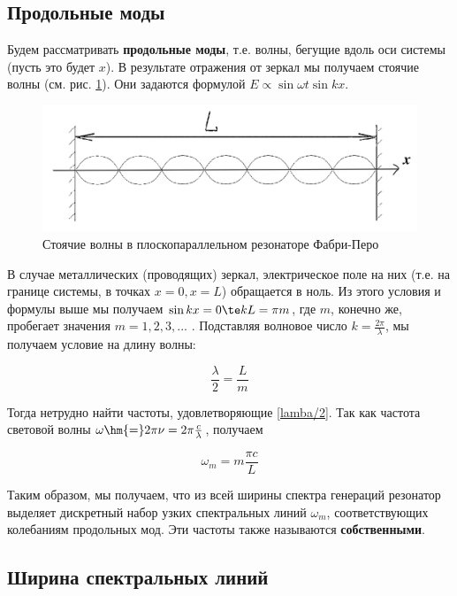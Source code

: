 \documentclass[12pt]{kiarticle}
\begin{document}
\subsection{Продольные моды}

Будем рассматривать \textbf{продольные моды}, т.е. волны, бегущие вдоль оси системы (пусть это будет $ x $). В результате отражения от зеркал мы получаем стоячие волны (см. рис. \ref{FP_waves}). Они задаются формулой $ E \propto \sin{\omega t} \sin{kx} $.

\begin{figure}[h!]
	\centering
	\includegraphics[width=0.6\linewidth]{FP_waves.png}
	\caption{Стоячие волны в плоскопараллельном резонаторе Фабри-Перо}
	\label{FP_waves}
\end{figure}

В случае металлических (проводящих) зеркал, электрическое поле на них (т.е. на границе системы, в точках $ x = 0, x = L $) обращается в ноль. Из этого условия и формулы выше мы получаем $ \sin{kx} = 0 \te kL =\pi m $, где $ m $, конечно же, пробегает значения $ m = 1, 2, 3, ... $ .  Подставляя волновое число $ k = \frac{2\pi}{\lambda} $, мы получаем условие на длину волны:

\begin{equation}\label{lamba/2}
\dfrac{\lambda}{2} = \dfrac{L}{m}
\end{equation}

Тогда нетрудно найти частоты, удовлетворяющие \eqref{lamba/2}. Так как частота световой волны $ \omega \hm{=} 2\pi \nu = 2 \pi \frac{c}{\lambda} $, получаем 

\begin{equation}\label{omega_m}
\omega_m = m \dfrac{\pi c}{L}
\end{equation}

Таким образом, мы получаем, что из всей ширины спектра генераций резонатор выделяет дискретный набор узких спектральных линий $ \omega_m $, соответствующих колебаниям продольных мод. Эти частоты также называются \textbf{собственными}. 

\subsection{Ширина спектральных линий}
\end{document}
